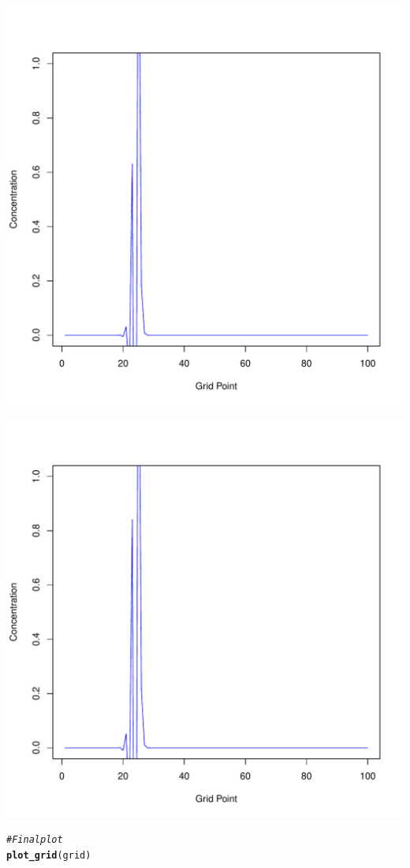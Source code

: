 \documentclass{tufte-handout}\usepackage[]{graphicx}\usepackage[]{xcolor}
\makeatletter
\def\maxwidth{ %
  \ifdim\Gin@nat@width>\linewidth
    \linewidth
  \else
    \Gin@nat@width
  \fi
}
\newcommand{\hlcom}[1]{\textcolor[rgb]{0.678,0.584,0.686}{\textit{#1}}}%
\newcommand{\hlstd}[1]{\textcolor[rgb]{0.345,0.345,0.345}{#1}}%
\newcommand{\hlkwd}[1]{\textcolor[rgb]{0.737,0.353,0.396}{\textbf{#1}}}%
\newenvironment{kframe}{%
 \def\at@end@of@kframe{}%
 \ifinner\ifhmode%
  \def\at@end@of@kframe{\end{minipage}}%
  \begin{minipage}{\columnwidth}%
 \fi\fi%
 \def\FrameCommand##1{\hskip\@totalleftmargin \hskip-\fboxsep
 \colorbox{shadecolor}{##1}\hskip-\fboxsep
     \hskip-\linewidth \hskip-\@totalleftmargin \hskip\columnwidth}%
 \MakeFramed {\advance\hsize-\width
   \@totalleftmargin\z@ \linewidth\hsize
   \@setminipage}}%
 {\par\unskip\endMakeFramed%
 \at@end@of@kframe}
\newenvironment{knitrout}{}{} %
\makeatother
\begin{document}
\begin{knitrout}
\includegraphics[width=\maxwidth]{figure/unnamed-chunk-1-9} 

\includegraphics[width=\maxwidth]{figure/unnamed-chunk-1-10} 
\begin{kframe}\begin{alltt}
\hlcom{# Final plot}
\hlkwd{plot_grid}\hlstd{(grid)}
\end{alltt}
\end{kframe}
\end{knitrout}
\end{document}
